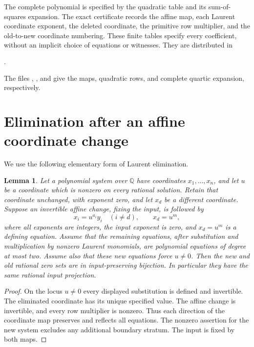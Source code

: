 \documentclass[11pt,a4paper]{article}
\newtheorem{lemma}[theorem]{Lemma}
\newcommand{\Q}{\mathbb Q}\newcommand{\Z}{\mathbb Z}
\begin{document}
The complete polynomial is specified by the quadratic table and its
sum-of-squares expansion. The exact certificate records the affine
map, each Laurent coordinate exponent, the deleted coordinate, the
primitive row multiplier, and the old-to-new coordinate numbering.
These finite tables specify every coefficient, without an implicit
choice of equations or witnesses. They are distributed in
\begin{center}\small
{}.
\end{center}
The files , ,
and  give the maps, quadratic rows,
and complete quartic expansion, respectively.

\section{Elimination after an affine coordinate change}

We use the following elementary form of Laurent elimination.

\begin{lemma}\label{lem:laurent}
Let a polynomial system over $\Q$ have coordinates $x_1,\ldots,x_n$,
and let $u$ be a coordinate which is nonzero on every rational solution.
Retain that coordinate unchanged, with exponent zero, and let $x_d$
be a different coordinate.
Suppose an invertible affine change, fixing the input, is followed by
\[
 x_i=u^{a_i}y_i\quad(i\ne d),\qquad x_d=u^m,
\]
where all exponents are integers, the input exponent is zero, and
$x_d=u^m$ is a defining equation. Assume that the remaining equations,
after substitution and multiplication by nonzero Laurent monomials,
are polynomial equations of degree at most two. Assume also that these
new equations force $u\ne0$.
Then the new and old rational zero sets are in input-preserving
bijection. In particular they have the same rational input projection.
\end{lemma}

\begin{proof}
On the locus $u\ne0$ every displayed substitution is defined and
invertible. The eliminated coordinate has its unique specified value.
The affine change is invertible, and every row multiplier is nonzero.
Thus each direction of the coordinate map preserves and reflects all
equations. The nonzero assertion for the new system excludes any
additional boundary stratum. The input is fixed by both maps.
\end{proof}
\end{document}
